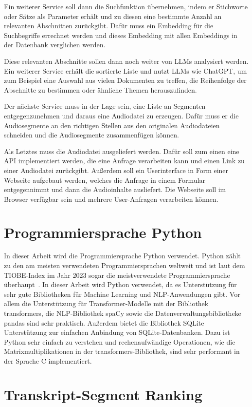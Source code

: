Ein weiterer Service soll dann die Suchfunktion übernehmen, indem er Stichworte oder Sätze als Parameter erhält und zu diesen eine bestimmte Anzahl an relevanten Abschnitten zurückgibt.
Dafür muss ein Embedding für die Suchbegriffe errechnet werden und dieses Embedding mit allen Embeddings in der Datenbank verglichen werden.

Diese relevanten Abschnitte sollen dann noch weiter von LLMs analysiert werden.
Ein weiterer Service erhält die sortierte Liste und nutzt LLMs wie ChatGPT, um zum Beispiel eine Auswahl aus vielen Dokumenten zu treffen, die Reihenfolge der Abschnitte zu bestimmen oder ähnliche Themen herauszufinden.

Der nächste Service muss in der Lage sein, eine Liste an Segmenten entgegenzunehmen und daraus eine Audiodatei zu erzeugen.
Dafür muss er die Audiosegmente an den richtigen Stellen aus den originalen Audiodateien schneiden und die Audiosegmente zusammenfügen können.

Als Letztes muss die Audiodatei ausgeliefert werden.
Dafür soll zum einen eine API implementiert werden, die eine Anfrage verarbeiten kann und einen Link zu einer Audiodatei zurückgibt.
Außerdem soll ein Userinterface in Form einer Webseite aufgebaut werden, welches die Anfrage in einem Formular entgegennimmt und dann die Audioinhalte ausliefert.
Die Webseite soll im Browser verfügbar sein und mehrere User-Anfragen verarbeiten können.
\section{Programmiersprache Python}

In dieser Arbeit wird die Programmiersprache Python verwendet.
Python zählt zu den am meisten verwendeten Programmiersprachen weltweit und ist laut dem TIOBE-Index im Jahr 2023 sogar die meistverwendete Programmiersprache überhaupt~\cite{index2023}.
In dieser Arbeit wird Python verwendet, da es Unterstützung für sehr gute Bibliotheken für Machine Learning und NLP-Anwendungen gibt.
Vor allem die Unterstützung für Transformer-Modelle mit der Bibliothek transformers, die NLP-Bibliothek spaCy sowie die Datenverwaltungsbibliotheke pandas sind sehr praktisch.
Außerdem bietet die Bibliothek SQLite Unterstützung zur einfachen Anbindung von SQLite-Datenbanken.
Dazu ist Python sehr einfach zu verstehen und rechenaufwändige Operationen, wie die Matrixmultiplikationen in der transformers-Bibliothek, sind sehr performant in der Sprache C implementiert.

\section{Transkript-Segment Ranking}

